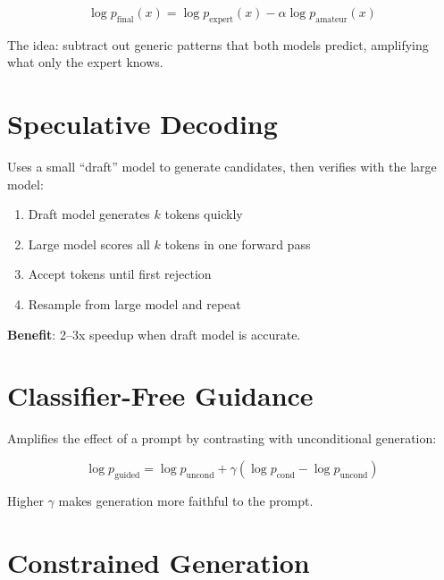 \begin{equation}
\log p_{\text{final}}(x) = \log p_{\text{expert}}(x) - \alpha \log p_{\text{amateur}}(x)
\end{equation}

The idea: subtract out generic patterns that both models predict, amplifying what only the expert knows.

\section{Speculative Decoding}

Uses a small ``draft'' model to generate candidates, then verifies with the large model:

\begin{enumerate}
    \item Draft model generates $k$ tokens quickly
    \item Large model scores all $k$ tokens in one forward pass
    \item Accept tokens until first rejection
    \item Resample from large model and repeat
\end{enumerate}

\textbf{Benefit}: 2--3x speedup when draft model is accurate.

\section{Classifier-Free Guidance}

Amplifies the effect of a prompt by contrasting with unconditional generation:

\begin{equation}
\log p_{\text{guided}} = \log p_{\text{uncond}} + \gamma(\log p_{\text{cond}} - \log p_{\text{uncond}})
\end{equation}

Higher $\gamma$ makes generation more faithful to the prompt.

\section{Constrained Generation}

